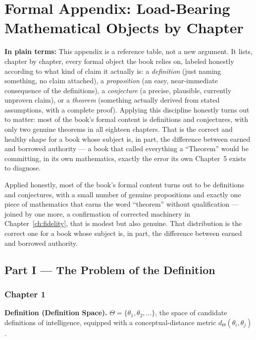 \chapter{Formal Appendix: Load-Bearing Mathematical Objects by Chapter}
\label{app:formal}

\begin{plainlanguage}
\textbf{In plain terms:} This appendix is a reference table, not a new argument. It lists, chapter by chapter, every formal object the book relies on, labeled honestly according to what kind of claim it actually is: a \emph{definition} (just naming something, no claim attached), a \emph{proposition} (an easy, near-immediate consequence of the definitions), a \emph{conjecture} (a precise, plausible, currently unproven claim), or a \emph{theorem} (something actually derived from stated assumptions, with a complete proof). Applying this discipline honestly turns out to matter: most of the book's formal content is definitions and conjectures, with only two genuine theorems in all eighteen chapters. That is the correct and healthy shape for a book whose subject is, in part, the difference between earned and borrowed authority --- a book that called everything a ``Theorem'' would be committing, in its own mathematics, exactly the error its own Chapter~5 exists to diagnose.
\end{plainlanguage}

Applied honestly, most of the book's formal content turns out to be definitions and conjectures, with a small number of genuine propositions and exactly one piece of mathematics that earns the word ``theorem'' without qualification --- joined by one more, a confirmation of corrected machinery in Chapter~\ref{ch:fidelity}, that is modest but also genuine. That distribution is the correct one for a book whose subject is, in part, the difference between earned and borrowed authority.

\section*{Part I --- The Problem of the Definition}

\subsection*{Chapter 1}

\textbf{Definition (Definition Space).} $\Theta = \{\theta_1, \theta_2, \ldots\}$, the space of candidate definitions of intelligence, equipped with a conceptual-distance metric $d_\Theta(\theta_i, \theta_j)$.

